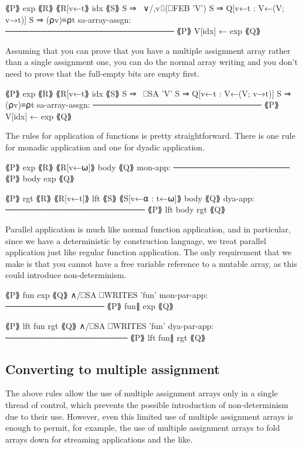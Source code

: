                 ⟪P⟫ exp ⟪R⟫
                ⟪R[v←t⟫ idx ⟪S⟫
                S ⇒ ~∨/,v⌷(⎕FEB 'V')
                S ⇒ Q[v←t : V←(V; v→t)]
                S ⇒ (⍴v)≡⍴t
sa-array-assgn: ─────────────────────────────
                ⟪P⟫ V[idx] ← exp ⟪Q⟫

Assuming that you can prove that you have a multiple assignment array rather
than a single assignment one, you can do the normal array writing and you don't
need to prove that the full-empty bits are empty first.

                ⟪P⟫ exp ⟪R⟫
                ⟪R[v←t⟫ idx ⟪S⟫
                S ⇒ ~⎕SA 'V'
                S ⇒ Q[v←t : V←(V; v→t)]
                S ⇒ (⍴v)≡⍴t
sa-array-assgn: ─────────────────────────────
                ⟪P⟫ V[idx] ← exp ⟪Q⟫

The rules for application of functions is pretty straightforward.
There is one rule for monadic application and one for dyadic 
application.

         ⟪P⟫ exp ⟪R⟫
         ⟪R[v←⍵]⟫ body ⟪Q⟫
mon-app: ────────────────────
         ⟪P⟫ { body } exp ⟪Q⟫

         ⟪P⟫ rgt ⟪R⟫
         ⟪R[v←t]⟫ lft ⟪S⟫
         ⟪S[v←⍺ : t←⍵]⟫ body ⟪Q⟫
dya-app: ────────────────────────
         ⟪P⟫ lft {body} rgt ⟪Q⟫

Parallel application is much like normal function application, 
and in particular, since we have a deterministic by construction
language, we treat parallel application just like regular function
application. The only requirement that we make is that you cannot have a free
variable reference to a mutable array, as this could introduce non-determinism.

             ⟪P⟫ fun exp ⟪Q⟫
             ∧/⎕SA ⎕WRITES 'fun'
mon-par-app: ─────────────────
             ⟪P⟫ fun∥ exp ⟪Q⟫

             ⟪P⟫ lft fun rgt ⟪Q⟫
             ∧/⎕SA ⎕WRITES 'fun'
dya-par-app: ─────────────────────
             ⟪P⟫ lft fun∥ rgt ⟪Q⟫

\subsection{Converting to multiple assignment}

The above rules allow the use of multiple assignment arrays only in a single
thread of control, which prevents the possible introduction of non-determinism
due to their use. However, even this limited use of multiple assignment arrays
is enough to permit, for example, the use of multiple assignment arrays to fold
arrays down for streaming applications and the like. 